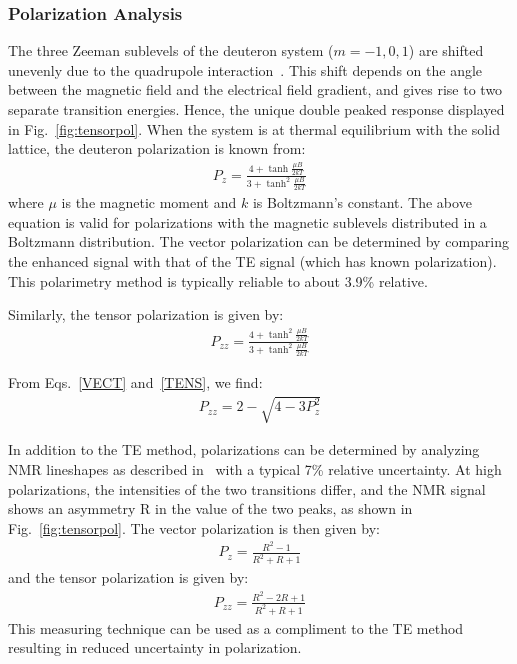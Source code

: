 \subsubsection{Polarization Analysis} 
The three Zeeman sublevels of the deuteron system ($m=-1,0,1$) are
shifted unevenly due to the quadrupole interaction~\cite{Meyer:1985dta}. This shift
depends on the angle between the magnetic field and the electrical field gradient, and gives rise to two separate transition
energies. Hence, the unique double peaked response displayed in Fig.~\ref{fig:tensorpol}.
When the system is at thermal equilibrium with the solid lattice, the deuteron polarization is known from:
\begin{eqnarray}
\label{VECT}
P_z = \frac{4+\tanh\frac{\mu B}{2 k T}} {3+\tanh^2\frac{\mu B}{2 k T}    }
\end{eqnarray}
where $\mu$ is the magnetic moment and $k$ is Boltzmann's constant. The above equation is valid for polarizations with the magnetic sublevels distributed in a Boltzmann distribution. The vector polarization can be determined by comparing
the enhanced signal with that of the TE signal (which has known polarization).  This polarimetry method is typically reliable to about 3.9\% relative.

Similarly, the tensor polarization is given by: 
\begin{eqnarray}
\label{TENS}
P_{zz} = \frac{4+\tanh^2\frac{\mu B}{2 k T}} {3+\tanh^2\frac{\mu B}{2 k T}    }
\end{eqnarray}

From Eqs.~\ref{VECT} and~\ref{TENS}, we find:
\begin{eqnarray*}
\label{PZZEQN}
P_{zz}= 2 - \sqrt{4-3 P_z^2}
\end{eqnarray*}


In addition to the TE method, polarizations can be determined by analyzing NMR lineshapes as described in~\cite{Dulya:1997qc} with a typical  7\% relative uncertainty.  At high polarizations, the
intensities of the two transitions differ, and the NMR signal shows an asymmetry R in the
value of the two peaks, as shown in Fig.~\ref{fig:tensorpol}.  The vector polarization is then given by:
\begin{eqnarray}
\label{RVECT}
P_{z} = \frac{R^2-1}{R^2+R+1}
\end{eqnarray}
and the tensor polarization is given by:
\begin{eqnarray}
\label{TVECT}P_{zz} = \frac{R^2-2 R +1}{R^2+R+1}
\end{eqnarray}
This measuring technique can be used as a compliment to the TE method resulting in reduced uncertainty in polarization.

